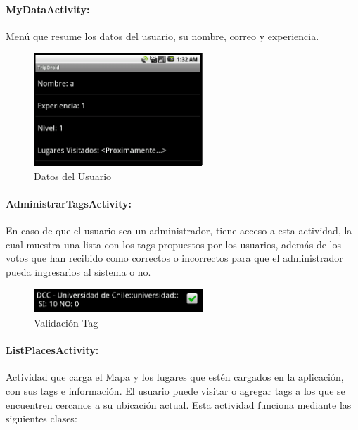 \documentclass[10pt,letterpaper]{article}
\begin{document}
\paragraph{MyDataActivity:} Menú que resume los datos del usuario, su nombre, correo y experiencia.

\begin{figure}[h]
\begin{center}
\includegraphics[width=180pt]{./imgs/TripdroidDatos.png}
\caption{Datos del Usuario}
\end{center}
\end{figure}

\newpage
\paragraph{AdministrarTagsActivity:} En caso de que el usuario sea un administrador, tiene acceso a esta actividad, la cual muestra una lista con los tags propuestos por los usuarios, además de los votos que han recibido como correctos o incorrectos para que el administrador pueda ingresarlos al sistema o no.

\begin{figure}[h]
\begin{center}
\includegraphics[width=180pt]{./imgs/TripdroidAdmin.png}
\caption{Validación Tag}
\end{center}
\end{figure}

\paragraph{ListPlacesActivity:} Actividad que carga el Mapa y los lugares que estén cargados en la aplicación, con sus tags e información. El usuario puede visitar o agregar tags a los que se encuentren cercanos a su ubicación actual. Esta actividad funciona mediante las siguientes clases:\\
\end{document}
